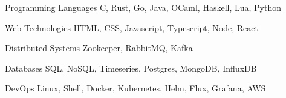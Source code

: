 


\begin{cvskills}

  \cvskill
    {Programming Languages}
    {C, Rust, Go, Java, OCaml, Haskell, Lua, Python}

  \cvskill
    {Web Technologies}
    {HTML, CSS, Javascript, Typescript, Node, React}

  \cvskill
    {Distributed Systems}
    {Zookeeper, RabbitMQ, Kafka}

  \cvskill
    {Databases}
    {SQL, NoSQL, Timeseries, Postgres, MongoDB, InfluxDB}

  \cvskill
    {DevOps}
    {Linux, Shell, Docker, Kubernetes, Helm, Flux, Grafana, AWS}


\end{cvskills}

